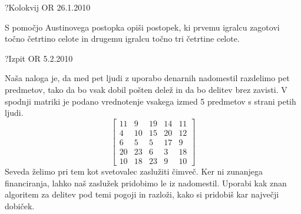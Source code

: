 
\begin{naloga}{?}{Kolokvij OR 26.1.2010}
\begin{vprasanje}
S pomočjo Austinovega postopka opiši postopek,
ki prvemu igralcu zagotovi točno četrtino celote
in drugemu igralcu točno tri četrtine celote.
\end{vprasanje}
\begin{odgovor}
\end{odgovor}
\end{naloga}


\begin{naloga}{?}{Izpit OR 5.2.2010}
\begin{vprasanje}
Naša naloga je,
da med pet ljudi z uporabo denarnih nadomestil razdelimo pet predmetov,
tako da bo vsak dobil pošten delež in da bo delitev brez zavisti.
V spodnji matriki je podano vrednotenje vsakega izmed 5 predmetov
s strani petih ljudi.
$$
\begin{bmatrix}
11 &  9 & 19 & 14 & 11 \\
 4 & 10 & 15 & 20 & 12 \\
 6 &  5 &  5 & 17 & 9  \\
20 & 23 &  6 &  3 & 18 \\
10 & 18 & 23 &  9 & 10
\end{bmatrix}
$$
Seveda želimo pri tem kot svetovalec zaslužiti čimveč.
Ker ni zunanjega financiranja, lahko naš zaslužek pridobimo le iz nadomestil.
Uporabi kak znan algoritem za delitev pod temi pogoji in razloži,
kako si pridobiš kar največji dobiček.
\end{vprasanje}
\begin{odgovor}
\end{odgovor}
\end{naloga}


